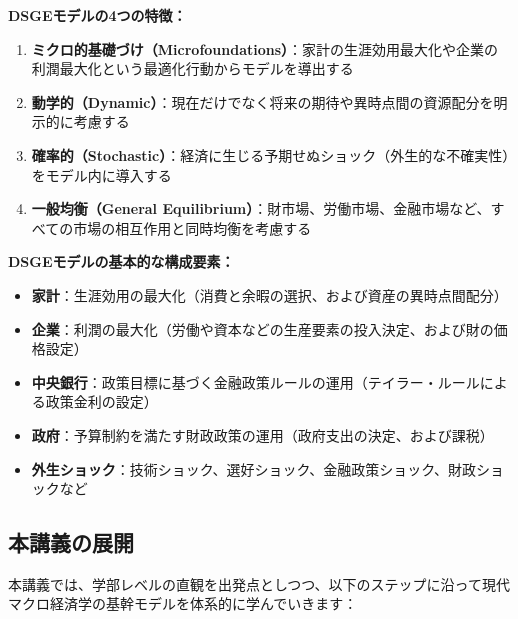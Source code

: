\documentclass[
  japanese,
  lualatex,
  ja=standard,
  12pt,
  a4paper]{ltjsarticle}
\providecommand{\tightlist}{%
  \setlength{\itemsep}{0pt}\setlength{\parskip}{0pt}}
\begin{document}
\textbf{DSGEモデルの4つの特徴：}

\begin{enumerate}
\def\labelenumi{\arabic{enumi}.}
\tightlist
\item
  \textbf{ミクロ的基礎づけ（Microfoundations）}：家計の生涯効用最大化や企業の利潤最大化という最適化行動からモデルを導出する
\item
  \textbf{動学的（Dynamic）}：現在だけでなく将来の期待や異時点間の資源配分を明示的に考慮する
\item
  \textbf{確率的（Stochastic）}：経済に生じる予期せぬショック（外生的な不確実性）をモデル内に導入する
\item
  \textbf{一般均衡（General
  Equilibrium）}：財市場、労働市場、金融市場など、すべての市場の相互作用と同時均衡を考慮する
\end{enumerate}

\textbf{DSGEモデルの基本的な構成要素：}

\begin{itemize}
\tightlist
\item
  \textbf{家計}：生涯効用の最大化（消費と余暇の選択、および資産の異時点間配分）
\item
  \textbf{企業}：利潤の最大化（労働や資本などの生産要素の投入決定、および財の価格設定）
\item
  \textbf{中央銀行}：政策目標に基づく金融政策ルールの運用（テイラー・ルールによる政策金利の設定）
\item
  \textbf{政府}：予算制約を満たす財政政策の運用（政府支出の決定、および課税）
\item
  \textbf{外生ショック}：技術ショック、選好ショック、金融政策ショック、財政ショックなど
\end{itemize}

\subsection{本講義の展開}\label{ux672cux8b1bux7fa9ux306eux5c55ux958b}

本講義では、学部レベルの直観を出発点としつつ、以下のステップに沿って現代マクロ経済学の基幹モデルを体系的に学んでいきます：
\end{document}
